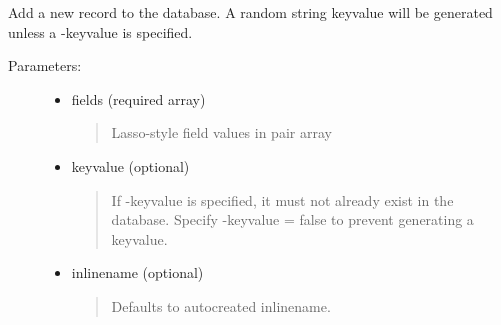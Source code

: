 \documentclass[letterpaper,10pt,english]{sphinxmanual}
\begin{document}
\begin{fulllineitems}

\begin{fulllineitems}
Add a new record to the database. A random string keyvalue will be generated
unless a -keyvalue is specified.
\begin{description}
\item[{Parameters:}] \leavevmode\begin{itemize}
\item {} 
fields (required array)
\begin{quote}

Lasso-style field values in pair array
\end{quote}

\item {} 
keyvalue (optional)
\begin{quote}

If -keyvalue is specified, it must not already exist in the database. Specify -keyvalue = false to prevent generating a keyvalue.
\end{quote}

\item {} 
inlinename (optional)
\begin{quote}

Defaults to autocreated inlinename.
\end{quote}

\end{itemize}

\end{description}

\end{fulllineitems}


\begin{fulllineitems}
\label{knop_database:knop_database.affected_count}
\end{fulllineitems}



\begin{fulllineitems}
\end{fulllineitems}


\begin{fulllineitems}
\label{knop_database:knop_database.affectedrecord_keyvalue}
\end{fulllineitems}




\end{fulllineitems}
\end{document}
